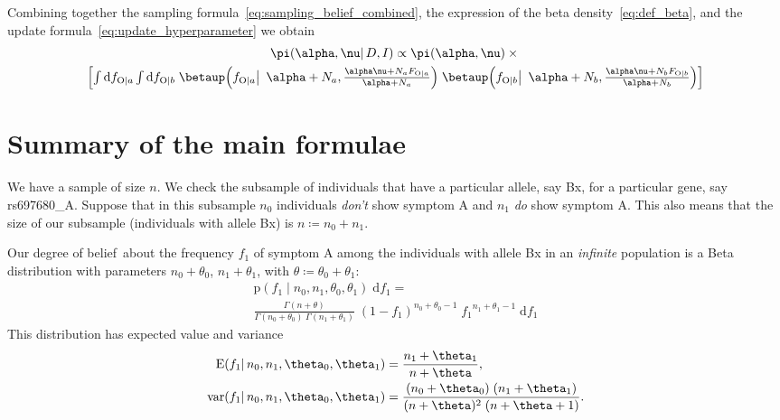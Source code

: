 \documentclass[\ifafour a4paper,12pt,\else a5paper,10pt,\fi%
onecolumn,oneside,article,%
british%
]{memoir}
\theoremstyle{remark}
\theoremstyle{innote}
\newcommand*{\di}{\mathrm{d}}%
\newcommand*{\defd}{\coloneqq}
\newcommand*{\pf}{\mathrm{p}}%
\renewcommand*{\|}{\mathpunct{|}}
\newcommand*{\bigcond}{\mathpunct{\big|\ }}%
\newcommand*{\tint}{\begingroup\textstyle\int\endgroup\nolimits}
\newcommand*{\E}{\mathrm{E}}
\DeclarePairedDelimiter\expp{(}{)}
\newcommand*{\expe}{\E\expp}%
\DeclareMathOperator{\var}{var}
\newcommand*{\dob}{degree of belief}
\newcommand*{\yD}{D}
\newcommand*{\yI}{I}
\newcommand*{\ya}{a}
\newcommand*{\yb}{b}
\newcommand*{\ysA}{\textrm{O}}%
\newcommand*{\dbeta}{\betaup}
\newcommand*{\dA}{\pi}
\newcommand*{\yA}{\alpha}
\newcommand*{\yqq}{\nu}
\newcommand*{\yq}{\bm{\yqq}}
\begin{document}
Combining together the sampling
formula~\eqref{eq:sampling_belief_combined}, the expression of the beta
density~\eqref{eq:def_beta}, and the update
formula~\eqref{eq:update_hyperparameter} we obtain
\begin{multline}
  \label{eq:parameter_posterior_first}
  \dA(\yA,\yq \|\yD, \yI) \propto
    \dA(\yA,\yq) \times{}\\
  \Bigl[   \tint\di f_{\ysA\|\ya}\tint\di f_{\ysA\|\yb}\;
  \dbeta\Bigl(f_{\ysA\|\ya} \bigcond \yA+N_{\ya},
  \frac{\yA\yq+N_{\ya}F_{\ysA\|\ya}}{\yA+N_{\ya}}
    \Bigl)\;
  \dbeta\Bigl(f_{\ysA\|\yb} \bigcond \yA+N_{\yb},
  \frac{\yA\yq+N_{\yb}F_{\ysA\|\yb}}{\yA+N_{\yb}}
    \Bigr)
       \Bigr]
\end{multline}


\section{Summary of the main formulae}

We have a sample of size $n$. We check the subsample of individuals that
have a particular allele, say Bx, for a particular gene, say rs697680\_A.
Suppose that in this subsample $n_0$ individuals \emph{don't} show symptom
A and $n_1$ \emph{do} show symptom A. This also means that the size of our
subsample (individuals with allele Bx) is $n \defd n_0+n_1$.

Our \dob\ about the frequency $f_1$ of symptom A among the individuals with
allele Bx in an \emph{infinite} population is a Beta distribution with
parameters $n_0+\theta_0$, $n_1+\theta_1$, with
$\theta \defd \theta_0+\theta_1$:
\begin{multline}
  \label{eq:beta_fr}
  \pf(f_1 \| n_0,n_1,\theta_0,\theta_1)\;\di f_1 ={}\\
  \frac{\Gamma(n+\theta)}{\Gamma(n_0+\theta_0)\;\Gamma(n_1+\theta_1)}
  \; (1-f_1)^{n_0+\theta_0-1}\;{f_1}^{n_1+\theta_1-1} \;\di f_1
\end{multline}
This distribution has expected value and variance
\begin{equation}
  \label{eq:exp_value}
  \begin{split}
  \expe{f_1 \| n_0, n_1, \theta_0,\theta_1} &= \frac{n_1+\theta_1}{n+\theta},
  \\
  \var(f_1 \|  n_0, n_1, \theta_0,\theta_1) &=
  \frac{(n_0+\theta_0)\;(n_1+\theta_1)}{(n+\theta)^2\;(n+\theta+1)}.
\end{split}
\end{equation}
\end{document}
